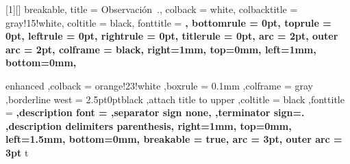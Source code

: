 [1][]
{
    breakable,
    title = Observación~\thetcbcounter.,
    colback = white,
    colbacktitle = gray!15!white,
    coltitle = black,
    fonttitle = \bfseries,
    bottomrule = 0pt,
    toprule = 0pt,
    leftrule = 0pt,
    rightrule = 0pt,
    titlerule = 0pt,
    arc = 2pt,
    outer arc = 2pt,
    colframe = black,
    right=1mm,
    top=0mm,
    left=1mm,
    bottom=0mm,
}




{
    enhanced
    ,colback = orange!23!white
    ,boxrule = 0.1mm
    ,colframe = gray
    ,borderline west = {2.5pt}{0pt}{black}
    ,attach title to upper
    ,coltitle = black
    ,fonttitle = \bfseries
    ,description font = \mdseries
    ,separator sign none,
    ,terminator sign={.\hspace{2mm}}
    ,description delimiters parenthesis,
    right=1mm,
    top=0mm,
    left=1.5mm,
    bottom=0mm,
    breakable = true,
    arc = 3pt,
    outer arc = 3pt
}
{t}